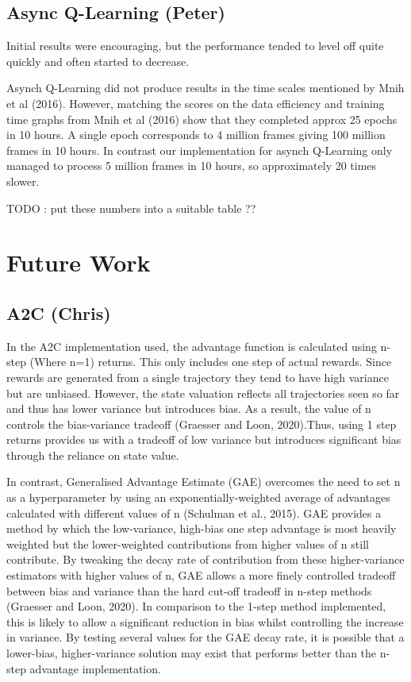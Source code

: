 \documentclass{article}
\begin{document}
\subsection{Async Q-Learning (Peter)}

Initial results were encouraging, but the performance tended to level off quite quickly and often started to decrease.

Asynch Q-Learning did not produce results in the time scales mentioned by Mnih et al (2016).
However, matching the scores on the data efficiency and training time graphs from Mnih et al (2016) show that they completed approx 25 epochs in 10 hours.
A single epoch corresponds to 4 million frames giving 100 million frames in 10 hours.
In contrast our implementation for asynch Q-Learning only managed to process 5 million frames in 10 hours, so approximately 20 times slower.

TODO : put these numbers into a suitable table ??

\section{Future Work}


\subsection{A2C (Chris)}

In the A2C implementation used, the advantage function is calculated using n-step (Where n=1) returns. This only includes one step of actual rewards. Since rewards are generated from a single trajectory they tend to have high variance but are unbiased. However, the state valuation reflects all trajectories seen so far and thus has lower variance but introduces bias. As a result, the value of n controls the bias-variance tradeoff (Graesser and Loon, 2020).Thus, using 1 step returns provides us with a tradeoff of low variance but introduces significant bias through the reliance on state value.

In contrast, Generalised Advantage Estimate (GAE) overcomes the need to set n as a hyperparameter by using an exponentially-weighted average of advantages calculated with different values of n (Schulman et al., 2015). GAE provides a  method by which the low-variance, high-bias one step advantage is most heavily weighted but the lower-weighted contributions from higher values of n still contribute. By tweaking the decay rate of contribution from these higher-variance estimators with higher values of n, GAE allows a more finely controlled tradeoff between bias and variance than the hard cut-off tradeoff in n-step methods (Graesser and Loon, 2020). In comparison to the 1-step method implemented, this is likely to allow a significant reduction in bias whilst controlling the increase in variance. By testing several values for the GAE decay rate, it is possible that a lower-bias, higher-variance solution may exist that performs better than the n-step advantage implementation.
\end{document}
